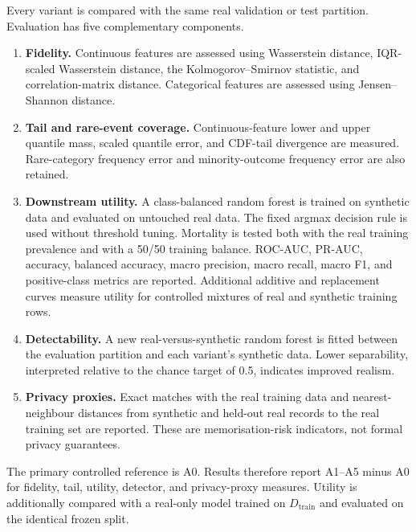 Every variant is compared with the same real validation or test partition.
Evaluation has five complementary components.

\begin{enumerate}
    \item \textbf{Fidelity.} Continuous features are assessed using
    Wasserstein distance, IQR-scaled Wasserstein distance, the
    Kolmogorov--Smirnov statistic, and correlation-matrix distance.
    Categorical features are assessed using Jensen--Shannon distance.

    \item \textbf{Tail and rare-event coverage.} Continuous-feature lower and
    upper quantile mass, scaled quantile error, and CDF-tail divergence are
    measured. Rare-category frequency error and minority-outcome frequency
    error are also retained.

    \item \textbf{Downstream utility.} A class-balanced random forest is
    trained on synthetic data and evaluated on untouched real data. The fixed
    argmax decision rule is used without threshold tuning. Mortality is tested
    both with the real training prevalence and with a 50/50 training balance.
    ROC-AUC, PR-AUC, accuracy, balanced accuracy, macro precision, macro
    recall, macro F1, and positive-class metrics are reported. Additional
    additive and replacement curves measure utility for controlled mixtures of
    real and synthetic training rows.

    \item \textbf{Detectability.} A new real-versus-synthetic random forest is
    fitted between the evaluation partition and each variant's synthetic data.
    Lower separability, interpreted relative to the chance target of 0.5,
    indicates improved realism.

    \item \textbf{Privacy proxies.} Exact matches with the real training data
    and nearest-neighbour distances from synthetic and held-out real records to
    the real training set are reported. These are memorisation-risk indicators,
    not formal privacy guarantees.
\end{enumerate}

The primary controlled reference is A0. Results therefore report A1--A5 minus
A0 for fidelity, tail, utility, detector, and privacy-proxy measures. Utility
is additionally compared with a real-only model trained on
$D_{\mathrm{train}}$ and evaluated on the identical frozen split.

